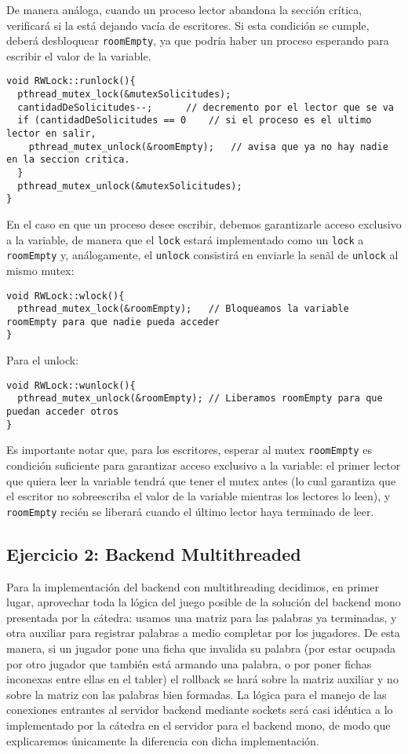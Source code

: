 De manera an\'aloga, cuando un proceso lector abandona la secci\'on cr\'itica, verificar\'a si la est\'a dejando vac\'ia de escritores. Si esta 
condici\'on se cumple, deber\'a desbloquear \verb|roomEmpty|, ya que podr\'ia haber un proceso esperando para escribir el valor de la variable.
\begin{verbatim}
void RWLock::runlock(){
  pthread_mutex_lock(&mutexSolicitudes);
  cantidadDeSolicitudes--;		// decremento por el lector que se va
  if (cantidadDeSolicitudes == 0	// si el proceso es el ultimo lector en salir,
    pthread_mutex_unlock(&roomEmpty);	// avisa que ya no hay nadie en la seccion critica.
  }
  pthread_mutex_unlock(&mutexSolicitudes);
}
\end{verbatim}

En el caso en que un proceso desee escribir, debemos garantizarle acceso exclusivo a la variable, de manera que el \verb|lock| estar\'a implementado como un
\verb|lock| a \verb|roomEmpty| y, an\'alogamente, el \verb|unlock| consistir\'a en enviarle la sen\~al de \verb|unlock| al mismo mutex:
 
\begin{verbatim}
void RWLock::wlock(){
  pthread_mutex_lock(&roomEmpty);	// Bloqueamos la variable roomEmpty para que nadie pueda acceder
}
\end{verbatim}

Para el unlock:
\begin{verbatim}
void RWLock::wunlock(){
  pthread_mutex_unlock(&roomEmpty);	// Liberamos roomEmpty para que puedan acceder otros
}
\end{verbatim}

Es importante notar que, para los escritores, esperar al mutex \verb|roomEmpty| es condici\'on suficiente para garantizar acceso exclusivo a la variable:
el primer lector que quiera leer la variable tendr\'a que tener el mutex antes (lo cual garantiza que el escritor no sobreescriba el valor de la variable
mientras los lectores lo leen), y \verb|roomEmpty| reci\'en se liberar\'a cuando el \'ultimo lector haya terminado de leer.

\subsection{Ejercicio 2: Backend Multithreaded}

Para la implementaci\'on del backend con multithreading decidimos, en primer lugar, aprovechar toda la l\'ogica del juego posible de la soluci\'on del
backend mono presentada por la c\'atedra: usamos una matriz para las palabras ya terminadas, y otra auxiliar para registrar palabras a medio completar por
los jugadores. De esta manera, si un jugador pone una ficha que invalida su palabra (por estar ocupada por otro jugador que tambi\'en est\'a armando una
palabra, o por poner fichas inconexas entre ellas en el tabler) el rollback se har\'a sobre la matriz auxiliar y no sobre la matriz con las palabras bien
formadas. La l\'ogica para el manejo de las conexiones entrantes al servidor backend mediante sockets ser\'a casi id\'entica a lo implementado por la 
c\'atedra en el servidor para el backend mono, de modo que explicaremos \'unicamente la diferencia con dicha implementaci\'on. 

